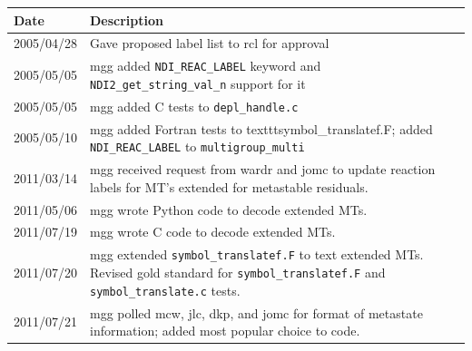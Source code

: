 \begin{tabular}{|p{72pt}|p{351pt}|} \hline
Date & Description \\ \hline
2005/04/28 & Gave proposed label list to rcl for approval \\ \hline
2005/05/05 & mgg added \texttt{NDI\_REAC\_LABEL} keyword and
\texttt{NDI2\_get\_string\_val\_n} support for it \\ \hline
2005/05/05 & mgg added C tests to \texttt{depl\_handle.c} \\ \hline
2005/05/10 & mgg added Fortran tests to texttt{symbol\_translatef.F};
added \texttt{NDI\_REAC\_LABEL} to \texttt{multigroup\_multi}
\\ \hline
2011/03/14 & mgg received request from wardr and jomc to update
reaction labels for MT's extended for metastable residuals.\\ \hline
2011/05/06 & mgg wrote Python code to decode extended MTs. \\ \hline
2011/07/19 & mgg wrote C code to decode extended MTs. \\ \hline
2011/07/20 & mgg extended \texttt{symbol\_translatef.F} to text
extended MTs.  Revised gold standard for \texttt{symbol\_translatef.F} and
\texttt{symbol\_translate.c} tests. \\ \hline
2011/07/21 & mgg polled mcw, jlc, dkp, and jomc for format of
metastate information; added most popular choice to code. \\ \hline
\end{tabular}
\vspace{24pt}
